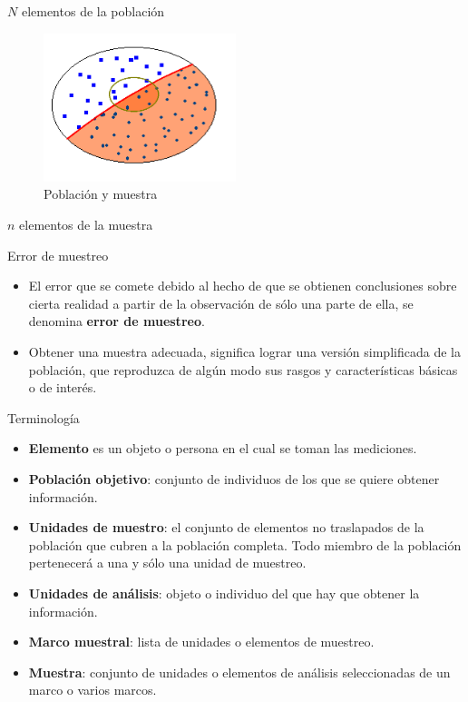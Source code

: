 \documentclass[
  10pt,
  ignorenonframetext,
]{beamer}
\begin{document}
\begin{frame}{}
\protect\hypertarget{section-1}{}
\(N\) elementos de la población

\begin{figure}
\centering
\includegraphics[width=0.5\textwidth,height=\textheight]{figuras/poblacion-muestra.png}
\caption{Población y muestra}
\end{figure}

\(n\) elementos de la muestra
\end{frame}

\begin{frame}{}
\protect\hypertarget{section-2}{}
\begin{block}{Error de muestreo}
\protect\hypertarget{error-de-muestreo}{}
\begin{itemize}
\item
  El error que se comete debido al hecho de que se obtienen conclusiones
  sobre cierta realidad a partir de la observación de sólo una parte de
  ella, se denomina \textbf{error de muestreo}.
\item
  Obtener una muestra adecuada, significa lograr una versión
  simplificada de la población, que reproduzca de algún modo sus rasgos
  y características básicas o de interés.
\end{itemize}
\end{block}
\end{frame}

\begin{frame}{}
\protect\hypertarget{section-3}{}
\begin{block}{Terminología}
\protect\hypertarget{terminologuxeda}{}
\begin{itemize}
\item
  \textbf{Elemento} es un objeto o persona en el cual se toman las
  mediciones.
\item
  \textbf{Población objetivo}: conjunto de individuos de los que se
  quiere obtener información.
\item
  \textbf{Unidades de muestro}: el conjunto de elementos no traslapados
  de la población que cubren a la población completa. Todo miembro de la
  población pertenecerá a una y sólo una unidad de muestreo.
\item
  \textbf{Unidades de análisis}: objeto o individuo del que hay que
  obtener la información.
\item
  \textbf{Marco muestral}: lista de unidades o elementos de muestreo.
\item
  \textbf{Muestra}: conjunto de unidades o elementos de análisis
  seleccionadas de un marco o varios marcos.
\end{itemize}
\end{block}
\end{frame}
\end{document}
